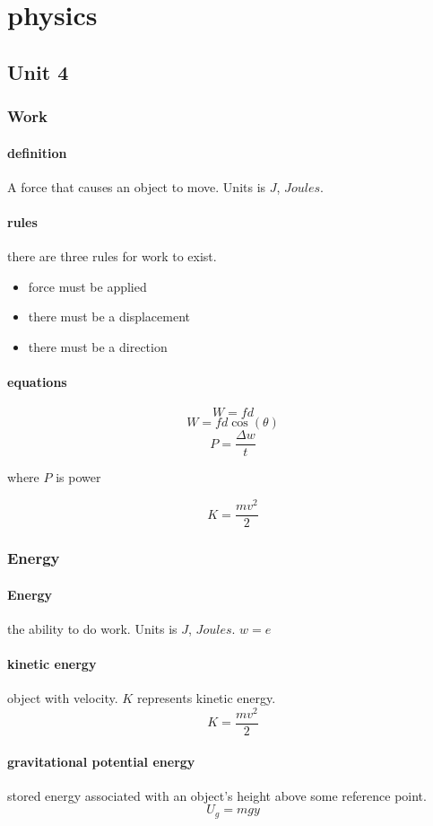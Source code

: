 \documentclass{article} %
\begin{document}
\section{physics}
    \subsection{Unit 4}
        \subsubsection{Work}
            \paragraph{definition}
                A force that causes an object to move. Units is $J$, $Joules$.
            \paragraph{rules}
                there are three rules for work to exist.
                \begin{itemize}
                    \item force must be applied
                    \item there must be a displacement
                    \item there must be a direction
                \end{itemize}
            \paragraph{equations}
                $$W=fd$$
                $$W=fd\cos(\theta)$$
                $$P=\dfrac{\Delta w}{t}$$
                \begin{center} where $P$ is power \end{center}
                $$K=\frac{mv^2}{2}$$
        \subsubsection{Energy}
            \paragraph{Energy}
                the ability to do work. Units is $J$, $Joules$. $w=e$
            \paragraph{kinetic energy}
                object with velocity. $K$ represents kinetic energy.
                $$K=\frac{mv^2}{2}$$ 
            \paragraph{gravitational potential energy}%
            \label{par:gravitational potential energy}
                stored energy associated with an object's height above some reference point.
                $$U_g=mgy$$
                
\end{document}
